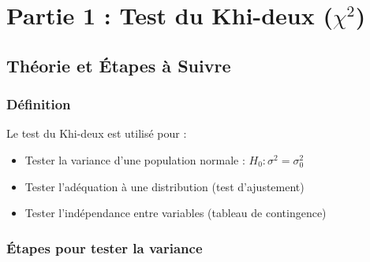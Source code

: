 \documentclass[11pt,a4paper]{article}
\newcommand{\chideux}{\chi^2}
\begin{document}
\newpage

\section{Partie 1 : Test du Khi-deux ($\chideux$)}

\subsection{Théorie et Étapes à Suivre}

\subsubsection{Définition}

Le test du Khi-deux est utilisé pour :
\begin{itemize}
    \item Tester la variance d'une population normale : $H_0 : \sigma^2 = \sigma_0^2$
    \item Tester l'adéquation à une distribution (test d'ajustement)
    \item Tester l'indépendance entre variables (tableau de contingence)
\end{itemize}

\subsubsection{Étapes pour tester la variance}
\end{document}
